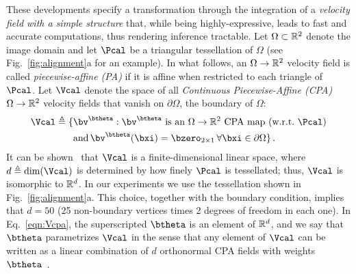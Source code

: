 \documentclass[twoside]{article}
\newcommand{\OREN}[1]{\textbf{[Freifeld says: #1]}}
\begin{document}
    These developments specify a transformation through the integration of a \emph{velocity field
    with a simple structure} that, while being highly-expressive, leads to fast
    and accurate computations, thus rendering inference tractable.
    Let $\Omega\subset\mathbb{R}^2$ denote the image domain and let $\Pcal$ be a
    triangular tessellation of $\Omega$ (see Fig.~\ref{fig:alignment}a for an example).
    In what follows, an $\Omega \to \mathbb{R}^2$ velocity field is called
    \emph{piecewise-affine (PA)} if it is affine when restricted to each triangle
    of $\Pcal$. Let $\Vcal$ denote the space of all \emph{Continuous Piecewise-Affine (CPA)}$\Omega \to \mathbb{R}^2$ velocity fields that vanish on $\partial\Omega$, the boundary
    of $\Omega$:
    \begin{align}\label{eqn:Vcpa}
    \begin{split}
      \Vcal \triangleq \{&\bv^\btheta: \bv^\btheta \text{ is an } \Omega\to\Rtwo \text{ CPA map (w.r.t.~}\Pcal\text{)}  \\
               &\text{and} \, \bv^\btheta(\bxi)=\bzero_{2\times1}\,  \forall \bxi\in\partial\Omega
              \} \, .
    \end{split}
    \end{align}%
    It can be shown~\cite{freifeld2015transform} that $\Vcal$ is a finite-dimensional linear space, where
    $d \triangleq \dim(\Vcal)$ is determined by how finely $\Pcal$ is tessellated; thus, $\Vcal$ is isomorphic to $\mathbb{R}^d$.
    In our experiments we use the tessellation shown
    in Fig.~\ref{fig:alignment}a. 
    This choice, together with the boundary condition, implies that $d = 50$
    (25 non-boundary vertices times 2 degrees of freedom in each one).
    In Eq.~\ref{eqn:Vcpa}, the superscripted $\btheta$ is an element 
    of $\mathbb{R}^d$, and we say that $\btheta$ parametrizes $\Vcal$ in the sense 
    that any element of $\Vcal$ can be written as a linear combination of $d$
    orthonormal CPA fields with weights $\btheta$~\cite{freifeld2015transform}.
    
\end{document}
